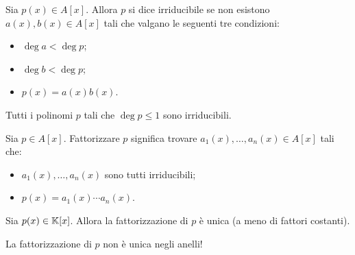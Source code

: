 \begin{definition}
    Sia $p(x) \in A[x]$. Allora $p$ si dice irriducibile se non esistono $a(x), b(x) \in A[x]$ tali che valgano le seguenti tre condizioni: \begin{itemize}
        \item $\deg a < \deg p$;
        \item $\deg b < \deg p$;
        \item $p(x) = a(x)b(x)$.
    \end{itemize}
\end{definition}

\begin{remark}
    Tutti i polinomi $p$ tali che $\deg p \leq 1$ sono irriducibili.
\end{remark}

\begin{definition}
    Sia $p \in A[x]$. Fattorizzare $p$ significa trovare $a_1(x), \dots, a_n(x) \in A[x]$ tali che: \begin{itemize}
        \item $a_1(x), \dots, a_n(x)$ sono tutti irriducibili;
        \item $p(x) = a_1(x) \cdots a_n(x)$.
    \end{itemize}
\end{definition}

\begin{proposition}
    Sia $p(x) \in \mathbb{K}[x]$. Allora la fattorizzazione di $p$ è unica (a meno di fattori costanti).
\end{proposition}

\begin{remark}
    La fattorizzazione di $p$ non è unica negli anelli!
\end{remark}

